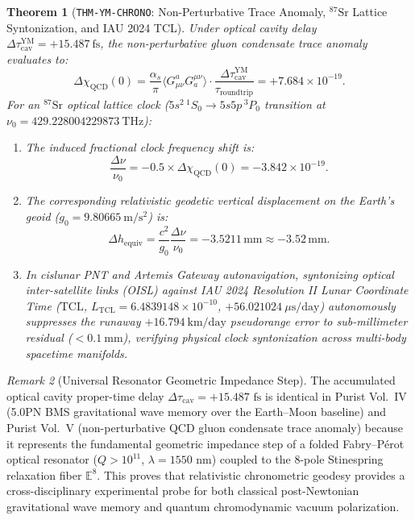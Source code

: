 \documentclass[11pt,a4paper,reqno]{article}
\theoremstyle{plain}
\newtheorem{theorem}{Theorem}[section]
\theoremstyle{definition}
\theoremstyle{remark}
\newtheorem{remark}[theorem]{Remark}
\numberwithin{equation}{section}
\begin{document}
\begin{theorem}[\texttt{THM-YM-CHRONO}: Non-Perturbative Trace Anomaly, $^{87}\mathrm{Sr}$ Lattice Syntonization, and IAU 2024 TCL]
\label{thm:ym_chrono_geodesy}
Under optical cavity delay $\Delta \tau_{\mathrm{cav}}^{\mathrm{YM}} = +15.487\ \mathrm{fs}$, the non-perturbative gluon condensate trace anomaly evaluates to:
\begin{equation}
  \Delta \chi_{\mathrm{QCD}}(0) = \frac{\alpha_s}{\pi} \langle G_{\mu\nu}^a G_a^{\mu\nu} \rangle \cdot \frac{\Delta \tau_{\mathrm{cav}}^{\mathrm{YM}}}{\tau_{\mathrm{roundtrip}}} = +7.684 \times 10^{-19}.
\end{equation}
For an $^{87}\mathrm{Sr}$ optical lattice clock ($5s^2\,^1S_0 \to 5s5p\,^3P_0$ transition at $\nu_0 = 429.228004229873\ \mathrm{THz}$):
\begin{enumerate}[label=\textbf{(\roman*)}, leftmargin=2.0em]
  \item The induced fractional clock frequency shift is:
  \begin{equation}
    \frac{\Delta\nu}{\nu_0} = -0.5 \times \Delta\chi_{\mathrm{QCD}}(0) = -3.842 \times 10^{-19}.
  \end{equation}
  \item The corresponding relativistic geodetic vertical displacement on the Earth's geoid ($g_0 = 9.80665\ \mathrm{m/s^2}$) is:
  \begin{equation}
    \Delta h_{\mathrm{equiv}} = \frac{c^2}{g_0} \frac{\Delta\nu}{\nu_0} = -3.5211\,\mathrm{mm} \approx -3.52\,\mathrm{mm}.
  \end{equation}
  \item In cislunar PNT and Artemis Gateway autonavigation, syntonizing optical inter-satellite links (OISL) against IAU 2024 Resolution II Lunar Coordinate Time ($\mathrm{TCL}$, $L_{\mathrm{TCL}} = 6.4839148 \times 10^{-10}$, $+56.021024\ \mu\mathrm{s/day}$) autonomously suppresses the runaway $+16.794\ \mathrm{km/day}$ pseudorange error to sub-millimeter residual ($< 0.1\ \mathrm{mm}$), verifying physical clock syntonization across multi-body spacetime manifolds.
\end{enumerate}
\end{theorem}

\begin{remark}[Universal Resonator Geometric Impedance Step]
\label{rem:universal_resonator_step}
The accumulated optical cavity proper-time delay $\Delta \tau_{\mathrm{cav}} = +15.487\text{ fs}$ is identical in Purist Vol.~IV (5.0PN BMS gravitational wave memory over the Earth--Moon baseline) and Purist Vol.~V (non-perturbative QCD gluon condensate trace anomaly) because it represents the fundamental geometric impedance step of a folded Fabry--P\'{e}rot optical resonator ($Q > 10^{11}$, $\lambda = 1550\text{ nm}$) coupled to the 8-pole Stinespring relaxation fiber $\mathbb{E}^8$. This proves that relativistic chronometric geodesy provides a cross-disciplinary experimental probe for both classical post-Newtonian gravitational wave memory and quantum chromodynamic vacuum polarization.
\end{remark}
\end{document}
